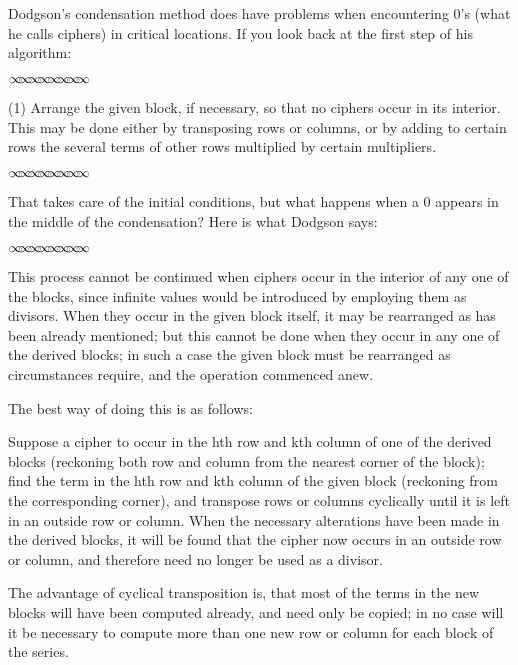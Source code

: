 \documentclass[11pt]{article}%
\theoremstyle{definition}
\newcommand{\sep}{\vspace{-3pt} \begin{center}
{\mathversion{normal}
$\infty \mspace{-5.5mu} \infty \mspace{-5.5mu}
\infty \mspace{-5.5mu} \infty \mspace{-5.5mu}
\infty \mspace{-5.5mu} \infty \mspace{-5.5mu}
\infty \mspace{-5.5mu} \infty$}
\end{center} \vspace{-3pt}}
\begin{document}
\bigskip

Dodgson's condensation method does have problems when encountering 0's (what
he calls ciphers) in critical locations. If you look back at the first step of
his algorithm:%

\sep


\textsf{(1) Arrange the given block, if necessary, so that no ciphers occur in
its interior. This may be done either by transposing rows or columns, or by
adding to certain rows the several terms of other rows multiplied by certain
multipliers.}%

\sep


That takes care of the initial conditions, but what happens when a 0 appears
in the middle of the condensation? Here is what Dodgson says:

\newpage%

\sep


\textsf{This process cannot be continued when ciphers occur in the interior of
any one of the blocks, since infinite values would be introduced by employing
them as divisors. When they occur in the given block itself, it may be
rearranged as has been already mentioned; but this cannot be done when they
occur in any one of the derived blocks; in such a case the given block must be
rearranged as circumstances require, and the operation commenced anew.}

\bigskip

\textsf{The best way of doing this is as follows:}

\bigskip

\textsf{Suppose a cipher to occur in the hth row and kth column of one of the
derived blocks (reckoning both row and column from the nearest corner of the
block); find the term in the hth row and kth column of the given block
(reckoning from the corresponding corner), and transpose rows or columns
cyclically until it is left in an outside row or column. When the necessary
alterations have been made in the derived blocks, it will be found that the
cipher now occurs in an outside row or column, and therefore need no longer be
used as a divisor.}

\bigskip

\textsf{The advantage of cyclical transposition is, that most of the terms in
the new blocks will have been computed already, and need only be copied; in no
case will it be necessary to compute more than one new row or column for each
block of the series.}
\end{document}
